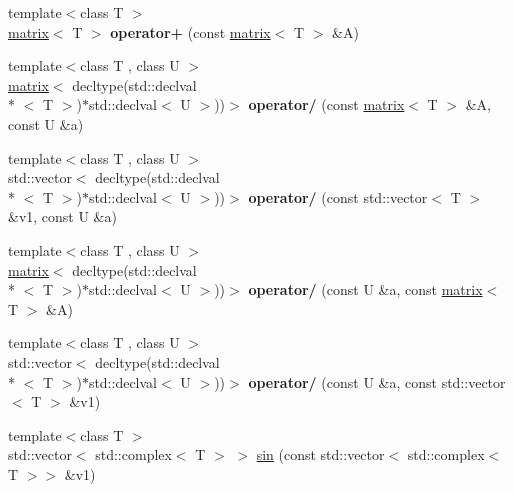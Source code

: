 \begin{DoxyCompactItemize}
\item 
\hypertarget{namespacekeycpp_a5b10f703c72875b9f5e2ecc5c7696f9c}{{\footnotesize template$<$class T $>$ }\\\hyperlink{classkeycpp_1_1matrix}{matrix}$<$ T $>$ {\bfseries operator+} (const \hyperlink{classkeycpp_1_1matrix}{matrix}$<$ T $>$ \&A)}\label{namespacekeycpp_a5b10f703c72875b9f5e2ecc5c7696f9c}

\item 
\hypertarget{namespacekeycpp_a3852c35cfcc8caa784465a26d04c68a1}{{\footnotesize template$<$class T , class U $>$ }\\\hyperlink{classkeycpp_1_1matrix}{matrix}$<$ decltype(std\-::declval\\*
$<$ T $>$)$\ast$std\-::declval$<$ U $>$))$>$ {\bfseries operator/} (const \hyperlink{classkeycpp_1_1matrix}{matrix}$<$ T $>$ \&A, const U \&a)}\label{namespacekeycpp_a3852c35cfcc8caa784465a26d04c68a1}

\item 
\hypertarget{namespacekeycpp_a394f23f09cf122a8e8c20a7afd40f58e}{{\footnotesize template$<$class T , class U $>$ }\\std\-::vector$<$ decltype(std\-::declval\\*
$<$ T $>$)$\ast$std\-::declval$<$ U $>$))$>$ {\bfseries operator/} (const std\-::vector$<$ T $>$ \&v1, const U \&a)}\label{namespacekeycpp_a394f23f09cf122a8e8c20a7afd40f58e}

\item 
\hypertarget{namespacekeycpp_aafc0089bdf204385c1e627755c5070b0}{{\footnotesize template$<$class T , class U $>$ }\\\hyperlink{classkeycpp_1_1matrix}{matrix}$<$ decltype(std\-::declval\\*
$<$ T $>$)$\ast$std\-::declval$<$ U $>$))$>$ {\bfseries operator/} (const U \&a, const \hyperlink{classkeycpp_1_1matrix}{matrix}$<$ T $>$ \&A)}\label{namespacekeycpp_aafc0089bdf204385c1e627755c5070b0}

\item 
\hypertarget{namespacekeycpp_a4d18510a87d417d5c38f24ded26a8cee}{{\footnotesize template$<$class T , class U $>$ }\\std\-::vector$<$ decltype(std\-::declval\\*
$<$ T $>$)$\ast$std\-::declval$<$ U $>$))$>$ {\bfseries operator/} (const U \&a, const std\-::vector$<$ T $>$ \&v1)}\label{namespacekeycpp_a4d18510a87d417d5c38f24ded26a8cee}

\item 
\hypertarget{namespacekeycpp_a60d3f3c9d269e14b23609d754684cdcf}{{\footnotesize template$<$class T $>$ }\\std\-::vector$<$ std\-::complex$<$ T $>$ $>$ \hyperlink{namespacekeycpp_a60d3f3c9d269e14b23609d754684cdcf}{sin} (const std\-::vector$<$ std\-::complex$<$ T $>$$>$ \&v1)}\label{namespacekeycpp_a60d3f3c9d269e14b23609d754684cdcf}


\end{DoxyCompactItemize}
